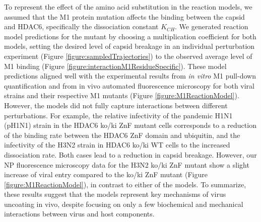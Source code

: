 To represent the effect of the amino acid substitution in the reaction models, we assumed that the M1 protein mutation affects the binding between the capsid and HDAC6, specifically the dissociation constant $K_{CH}$. We generated reaction model predictions for the mutant by choosing a multiplication coefficient for both models, setting the desired level of capsid breakage in an individual perturbation experiment (Figure \ref{figure:sampledTrajectories}) to the observed average level of M1 binding (Figure \ref{figure:interactionM1ResidueSpecific}). These model predictions aligned well with the experimental results from \textit{in vitro} M1 pull-down quantification and from in vivo automated fluorescence microscopy for both viral strains and their respective M1 mutants (Figure \ref{figure:M1ReactionModel}). However, the models did not fully capture interactions between different perturbations. For example, the relative infectivity of the pandemic H1N1 (pH1N1) strain in the HDAC6 ko/ki ZnF mutant cells corresponds to a reduction of the binding rate  between the HDAC6 ZnF domain and ubiquitin, and the infectivity of the H3N2 strain in HDAC6 ko/ki WT cells to the increased dissociation rate. Both cases lead to a reduction in capsid breakage. However, our NP fluorescence microscopy data for the H3N2 ko/ki ZnF mutant show a slight increase of viral entry compared to the ko/ki ZnF mutant (Figure \ref{figure:M1ReactionModel}), in contrast to either of the models. To summarize, these results suggest that the models represent key mechanisms of virus uncoating in vivo, despite focusing on only a few biochemical and mechanical interactions between virus and host components.

